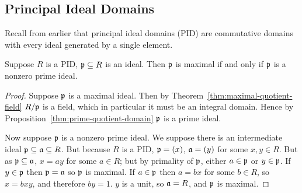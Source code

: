 \subsection*{Principal Ideal Domains}

\begin{remark}
    Recall from earlier that principal ideal domains (PID)
    are commutative domains with every ideal generated by a single element.
\end{remark}
\begin{proposition}\label{prop:pid-maximal-is-prime}
    Suppose \(R\) is a PID, \(\mathfrak{p} \subseteq R\) is an ideal.
    Then \(\mathfrak{p}\) is maximal if and only if \(\mathfrak{p}\) is a nonzero prime ideal.
\end{proposition}
\begin{proof}
    Suppose \(\mathfrak{p}\) is a maximal ideal.
    Then by Theorem~\ref{thm:maximal-quotient-field} \(R/\mathfrak{p}\) is a field,
    which in particular it must be an integral domain.
    Hence by Proposition~\ref{thm:prime-quotient-domain} \(\mathfrak{p}\) is a prime ideal.

    Now suppose \(\mathfrak{p}\) is a nonzero prime ideal.
    We suppose there is an intermediate ideal \(\mathfrak{p} \subseteq \mathfrak{a} \subseteq R\).
    But because \(R\) is a PID,
    \(\mathfrak{p} = (x)\), \(\mathfrak{a} = (y)\) for some \(x,y \in R\).
    But as \(\mathfrak{p} \subseteq \mathfrak{a}\), \(x = ay\) for some \(a \in R\);
    but by primality of \(\mathfrak{p}\), either \(a \in \mathfrak{p}\) or \(y \in \mathfrak{p}\).
    If \(y \in \mathfrak{p}\) then \(\mathfrak{p} = \mathfrak{a}\) so \(\mathfrak{p}\) is maximal.
    If \(a \in \mathfrak{p}\) then \(a = bx\) for some \(b \in R\),
    so \(x = bxy\), and therefore \(by = 1\).
    \(y\) is a unit, so \(\mathfrak{a} = R\), and \(\mathfrak{p}\) is maximal.
\end{proof}

